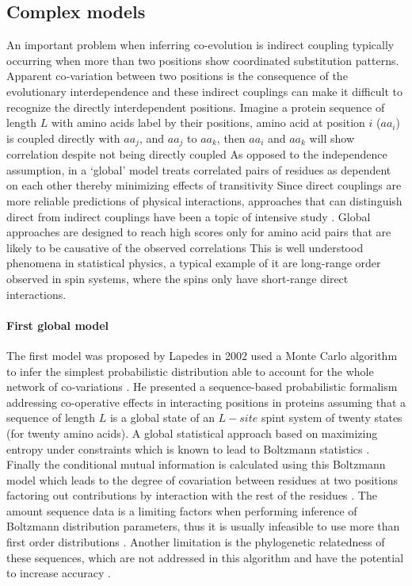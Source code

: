 \subsection{Complex models}

An important problem when inferring co-evolution is indirect coupling typically occurring when more than two positions show coordinated substitution patterns.
Apparent co‐variation between two positions is the consequence of the evolutionary interdependence and these indirect couplings can make it difficult to recognize the directly interdependent positions.
Imagine a protein sequence of length $L$ with amino acids label by their positions, amino acid at position $i$ ($aa_i$) is coupled directly with $aa_j$, and $aa_j$ to $aa_k$, then $aa_i$ and $aa_k$ will show correlation despite not being directly coupled \cite{weigt2009identification}
As opposed to the independence assumption, in a `global' model treats correlated pairs of residues as dependent on each other thereby minimizing effects of transitivity  \cite{marks2012protein}
Since direct couplings are more reliable predictions of physical interactions, approaches that can distinguish direct from indirect couplings have been a topic of intensive study \cite{de2013emerging}.
Global approaches are designed to reach high scores only for amino acid pairs that are likely to be causative of the observed correlations \cite{marks2012protein}
This is well understood phenomena in statistical physics, a typical example of it are long-range order observed in spin systems, where the spins only have short-range direct interactions.  \cite{marks2012protein:REF}

\paragraph{First global model}
The first model was proposed by Lapedes in 2002 \cite{lapedes2012using} used a Monte Carlo algorithm to infer the simplest probabilistic distribution able to account for the whole network of co‐variations \cite{de2013emerging}.
He presented a sequence-based probabilistic formalism addressing co-operative effects in interacting positions in proteins assuming that a sequence of length $L$ is a global state of an $L-site$ spint system of twenty states (for twenty amino acids).
A global statistical approach based on maximizing entropy under constraints which is known to lead to Boltzmann statistics \cite{marks2012protein}.
Finally the conditional mutual information is calculated using this Boltzmann model which leads to the degree of covariation between residues at two positions factoring out contributions by interaction with the rest of the residues \cite{marks2012protein}.
The amount sequence data is a limiting factors when performing inference of Boltzmann distribution parameters, thus it is usually infeasible to use more than first order distributions \cite{lapedes2012using}.
Another limitation is the phylogenetic relatedness of these sequences, which are not addressed in this algorithm and have the potential to increase accuracy \cite{lapedes2012using}.

